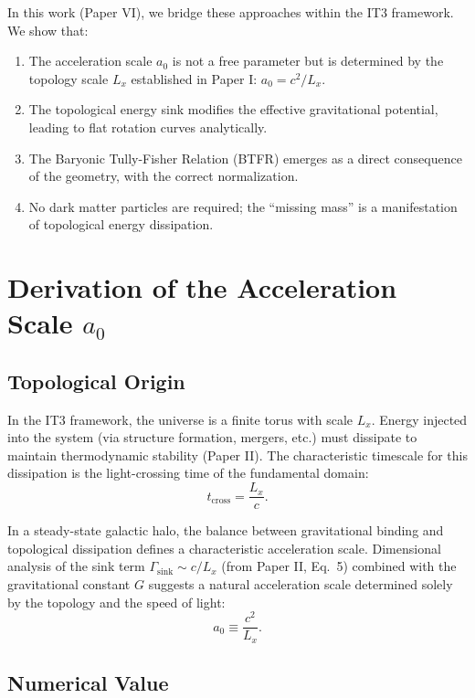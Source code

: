 \documentclass[12pt,a4paper]{article}
\begin{document}
In this work (Paper VI), we bridge these approaches within the IT3 framework. We show that:
\begin{enumerate}
    \item The acceleration scale $a_0$ is not a free parameter but is determined by the topology scale $L_x$ established in Paper I: $a_0 = c^2/L_x$.
    \item The topological energy sink modifies the effective gravitational potential, leading to flat rotation curves analytically.
    \item The Baryonic Tully-Fisher Relation (BTFR) emerges as a direct consequence of the geometry, with the correct normalization.
    \item No dark matter particles are required; the ``missing mass'' is a manifestation of topological energy dissipation.
\end{enumerate}

\section{Derivation of the Acceleration Scale $a_0$}

\subsection{Topological Origin}

In the IT3 framework, the universe is a finite torus with scale $L_x$. Energy injected into the system (via structure formation, mergers, etc.) must dissipate to maintain thermodynamic stability (Paper II). The characteristic timescale for this dissipation is the light-crossing time of the fundamental domain:
\begin{equation}
t_{\mathrm{cross}} = \frac{L_x}{c}.
\end{equation}

In a steady-state galactic halo, the balance between gravitational binding and topological dissipation defines a characteristic acceleration scale. Dimensional analysis of the sink term $\Gamma_{\mathrm{sink}} \sim c/L_x$ (from Paper II, Eq.~5) combined with the gravitational constant $G$ suggests a natural acceleration scale determined solely by the topology and the speed of light:
\begin{equation}
a_0 \equiv \frac{c^2}{L_x}.
\label{eq:a0_def}
\end{equation}

\subsection{Numerical Value}
\end{document}
